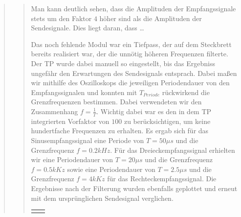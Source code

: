 \begin{quote}
\begin{quote}
                Man kann deutlich sehen, dass die Amplituden der Empfangssignale
                stets um den Faktor $4$ höher sind als die Amplituden der
                Sendesignale. Dies liegt daran, dass \ldots
                
                Das noch fehlende Modul war ein Tiefpass, der auf dem
                Steckbrett bereits realisiert war, der die unnötig höheren
                Frequenzen filterte.
                Der TP wurde dabei manuell so eingestellt, bis das Ergebniss ungefähr 
                den Erwartungen des Sendesignals entsprach. Dabei maßen wir
                mithilfe des Oszilloskops die jeweiligen Periodendauer von den
                Empfangssignalen und konnten mit $T_{Periode}$ rückwirkend die
                Grenzfrequenzen bestimmen. Dabei verwendeten wir den
                Zusammenhang $f = \frac{1}{T}$. Wichtig dabei war es den in dem
                TP integrierten Vorfaktor von $100$ zu berücksichtigen, um keine 
                hundertfache Frequenzen zu erhalten. Es ergab sich für das
                Sinusempfangssignal eine Periode von $T = 50\mu s$ und die
                Grenzfrequenz $f = 0.2 kHz$. Für das Dreieckempfangssignal
                erhielten wir eine Periodendauer von $T = 20\mu s$ und die Grenzfrequenz
                $f = 0.5 kKz$ sowie eine Periodendauer von $T = 2.5\mu s$ und
                die Grenzfrequenz $f = 4 kKz$ für das Rechteckempfangssignal.
                Die Ergebnisse nach der Filterung wurden ebenfalls geplottet und
                erneut mit dem ursprünglichen Sendesignal verglichen.
                
                \begin{center}
            \begin{tabular}{ll}

            \hspace{-14em}
                \begin{minipage}{0.6\textwidth}


\end{minipage}
\end{tabular}
\end{center}
\end{quote}
\end{quote}

